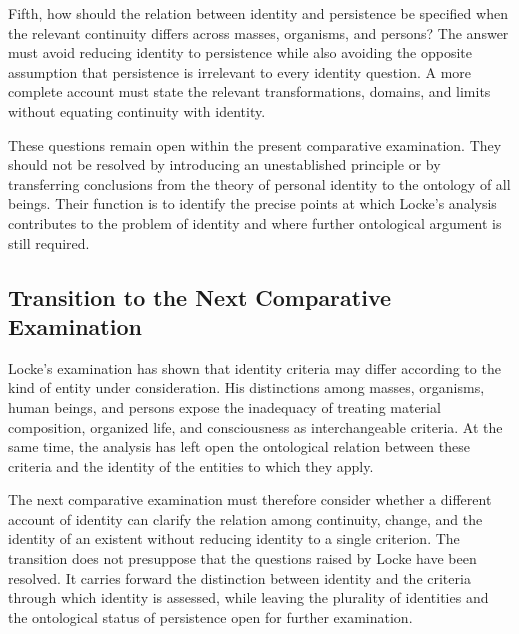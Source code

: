Fifth, how should the relation between identity
and persistence be specified when the relevant
continuity differs across masses, organisms,
and persons? The answer must avoid reducing
identity to persistence while also avoiding
the opposite assumption that persistence is
irrelevant to every identity question. A
more complete account must state the relevant
transformations, domains, and limits without
equating continuity with identity.

\label{para:VS.B01.P01.C08.S08.SS15.P006}

These questions remain open within the present
comparative examination. They should not be
resolved by introducing an unestablished
principle or by transferring conclusions
from the theory of personal identity to
the ontology of all beings. Their function
is to identify the precise points at which
Locke's analysis contributes to the problem
of identity and where further ontological
argument is still required.


\subsection{Transition to the Next Comparative Examination}
\label{subsec:ch08-locke-transition}

\label{para:VS.B01.P01.C08.S08.SS16.P001}

Locke's examination has shown that identity
criteria may differ according to the kind
of entity under consideration. His distinctions
among masses, organisms, human beings, and
persons expose the inadequacy of treating
material composition, organized life, and
consciousness as interchangeable criteria.
At the same time, the analysis has left open
the ontological relation between these
criteria and the identity of the entities
to which they apply.

\label{para:VS.B01.P01.C08.S08.SS16.P002}

The next comparative examination must therefore
consider whether a different account of identity
can clarify the relation among continuity,
change, and the identity of an existent without
reducing identity to a single criterion.
The transition does not presuppose that the
questions raised by Locke have been resolved.
It carries forward the distinction between
identity and the criteria through which identity
is assessed, while leaving the plurality of
identities and the ontological status of
persistence open for further examination.


